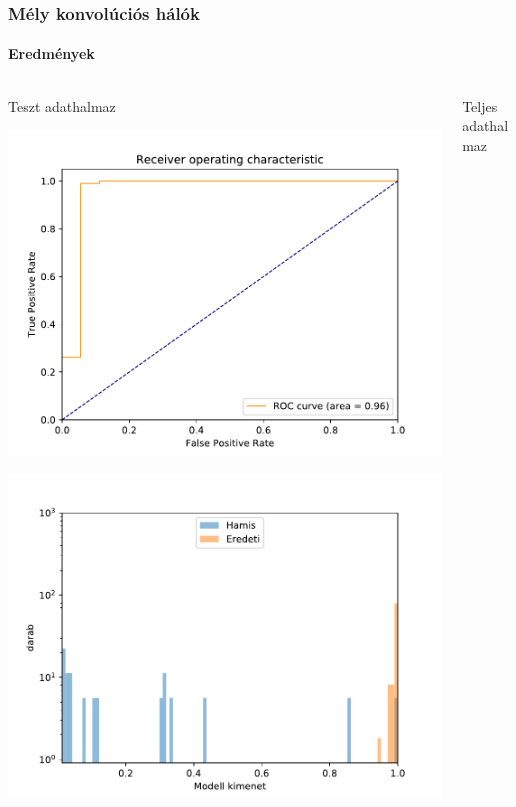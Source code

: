 \documentclass[11pt]{beamer}
\begin{document}
\begin{frame}
\frametitle{Mély konvolúciós hálók}
\framesubtitle{Eredmények}





\begin{columns} [t]
	\begin{column}{.5\textwidth}
		\centering
		Teszt adathalmaz
		
		\includegraphics[scale=0.25]{ruc-curve-test-ujratanitva.pdf}
		
		\includegraphics[scale=0.25]{histogram-ujratanitott-log-skala-test.pdf}
		
	\end{column}
	\begin{column}{.5\textwidth}
		\centering
		Teljes adathalmaz
		

\end{column}
\end{columns}
\end{frame}
\end{document}
